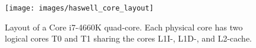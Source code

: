 
\begin{figure}[h!]
  \centering
  \texttt{[image: images/haswell\_core\_layout]}
  \caption{Layout of a Core i7-4660K quad-core.
    Each physical core has two logical cores T0 and T1 sharing the cores L1I-,
    L1D-, and L2-cache.}
  \label{state:fig:core_layout}
\end{figure}

\begin{comment}
\begin{itemize}
  \item diagram of architecture: four cores with L1I/D \& L2 cache; two smt/ht
    cores per physical core; L3 cache shared and sliced, ring buffer for
    access; mem controler in uncore package;
  \item 4 prefetcher per cache; 2 for L1D, 2 for L2 cache
  \item L1D \& L2 cache data is present in L3 cache to be able to redirect
    requests from other cores to the correct cache. --> Issue with security; no
    cache side attack surface reduction
  \item IF security: dual socket system with one core dedicated to security
    tasks for an interval
  \item L3 cache slices corespond to number of cores
  \item logic portion and data array portion; access, coherency, memory
    ordering, LLC misses, writeback to memory; cache lines
  \item hash function uniformly distributes addresses
  \item access times to L3 cache varies depending on travel distance on the
    bi-directional ring buffer
  \item system agent receives memory requests not serviced by cache and
    redirects to IMC
\end{itemize}
\end{comment}

